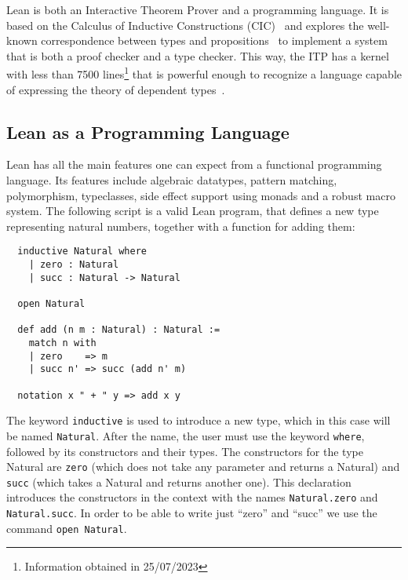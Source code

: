 
Lean is both an Interactive Theorem Prover and a programming
language. It is based on the Calculus of Inductive Constructions (CIC)~\cite{cic_ref} and explores the well-known correspondence between types and propositions~\cite{ch_correspondence} to implement a system that is both a proof checker and a type checker. This way, the ITP has a kernel with less than 7500 lines\footnote{Information obtained in 25/07/2023} that is powerful enough to recognize a language capable of expressing the theory of dependent types~\cite{dep_type_theory}.

\subsection{Lean as a Programming Language}

Lean has all the main features one can expect from a functional programming language. Its features include algebraic datatypes, pattern matching, polymorphism, typeclasses, side effect support using monads and a robust macro system. The following script is a valid Lean program, that defines a new type representing natural numbers, together with a function for adding them:

\begin{verbatim}
  inductive Natural where
    | zero : Natural
    | succ : Natural -> Natural

  open Natural

  def add (n m : Natural) : Natural :=
    match n with
    | zero    => m
    | succ n' => succ (add n' m)

  notation x " + " y => add x y
\end{verbatim}

The keyword \texttt{inductive} is used to introduce a new type, which in this case will be named \texttt{Natural}. After the name, the user must use the keyword \texttt{where}, followed by its constructors and their types. The constructors for the type Natural are \texttt{zero} (which does not take any parameter and returns a Natural) and \texttt{succ} (which takes a Natural and returns another one). This declaration introduces the constructors in the context with the names \texttt{Natural.zero} and \texttt{Natural.succ}. In order to be able to write just ``zero'' and ``succ'' we use the command \texttt{open Natural}.

